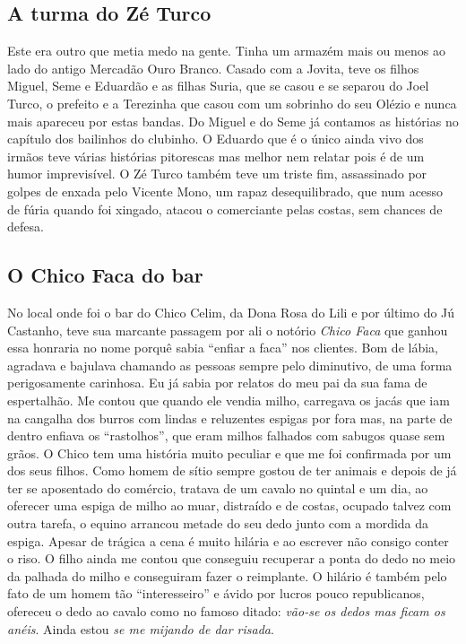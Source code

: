 \documentclass[12pt,brazil,]{book}
\begin{document}
\subsection{A turma do Zé Turco}\label{a-turma-do-zuxe9-turco}

Este era outro que metia medo na gente. Tinha um armazém mais ou menos
ao lado do antigo Mercadão Ouro Branco. Casado com a Jovita, teve os
filhos Miguel, Seme e Eduardão e as filhas Suria, que se casou e se
separou do Joel Turco, o prefeito e a Terezinha que casou com um
sobrinho do seu Olézio e nunca mais apareceu por estas bandas. Do Miguel
e do Seme já contamos as histórias no capítulo dos bailinhos do
clubinho. O Eduardo que é o único ainda vivo dos irmãos teve várias
histórias pitorescas mas melhor nem relatar pois é de um humor
imprevisível. O Zé Turco também teve um triste fim, assassinado por
golpes de enxada pelo Vicente Mono, um rapaz desequilibrado, que num
acesso de fúria quando foi xingado, atacou o comerciante pelas costas,
sem chances de defesa.

\subsection{O Chico Faca do bar}\label{o-chico-faca-do-bar}

No local onde foi o bar do Chico Celim, da Dona Rosa do Lili e por
último do Jú Castanho, teve sua marcante passagem por ali o notório
\emph{Chico Faca} que ganhou essa honraria no nome porquê sabia ``enfiar
a faca'' nos clientes. Bom de lábia, agradava e bajulava chamando as
pessoas sempre pelo diminutivo, de uma forma perigosamente carinhosa. Eu
já sabia por relatos do meu pai da sua fama de espertalhão. Me contou
que quando ele vendia milho, carregava os jacás que iam na cangalha dos
burros com lindas e reluzentes espigas por fora mas, na parte de dentro
enfiava os ``rastolhos'', que eram milhos falhados com sabugos quase sem
grãos. O Chico tem uma história muito peculiar e que me foi confirmada
por um dos seus filhos. Como homem de sítio sempre gostou de ter animais
e depois de já ter se aposentado do comércio, tratava de um cavalo no
quintal e um dia, ao oferecer uma espiga de milho ao muar, distraído e
de costas, ocupado talvez com outra tarefa, o equino arrancou metade do
seu dedo junto com a mordida da espiga. Apesar de trágica a cena é muito
hilária e ao escrever não consigo conter o riso. O filho ainda me contou
que conseguiu recuperar a ponta do dedo no meio da palhada do milho e
conseguiram fazer o reimplante. O hilário é também pelo fato de um homem
tão ``interesseiro'' e ávido por lucros pouco republicanos, ofereceu o
dedo ao cavalo como no famoso ditado: \emph{vão-se os dedos mas ficam os
anéis}. Ainda estou \emph{se me mijando de dar risada}.
\end{document}
